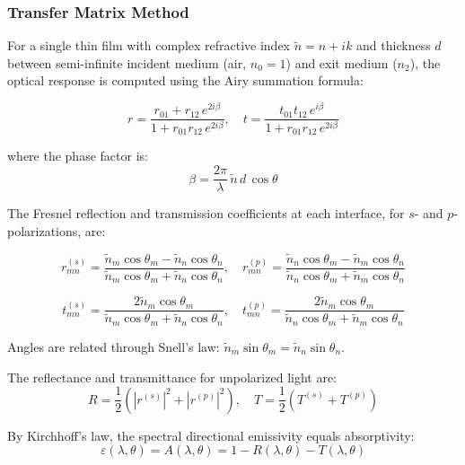 \subsubsection{Transfer Matrix Method}

For a single thin film with complex refractive index $\tilde{n} = n + ik$ and thickness $d$ between semi-infinite incident medium (air, $n_0 = 1$) and exit medium ($n_2$), the optical response is computed using the Airy summation formula:

\begin{equation}
  r = \frac{r_{01} + r_{12}\, e^{2i\beta}}{1 + r_{01} r_{12}\, e^{2i\beta}}, \quad
  t = \frac{t_{01} t_{12}\, e^{i\beta}}{1 + r_{01} r_{12}\, e^{2i\beta}}
  \label{eq:airy}
\end{equation}

where the phase factor is:
\begin{equation}
  \beta = \frac{2\pi}{\lambda}\,\tilde{n}\,d\,\cos\theta
  \label{eq:phase}
\end{equation}

The Fresnel reflection and transmission coefficients at each interface, for $s$- and $p$-polarizations, are:

\begin{equation}
  r_{mn}^{(s)} = \frac{\tilde{n}_m \cos\theta_m - \tilde{n}_n \cos\theta_n}{\tilde{n}_m \cos\theta_m + \tilde{n}_n \cos\theta_n}, \quad
  r_{mn}^{(p)} = \frac{\tilde{n}_n \cos\theta_m - \tilde{n}_m \cos\theta_n}{\tilde{n}_n \cos\theta_m + \tilde{n}_m \cos\theta_n}
  \label{eq:fresnel_r}
\end{equation}

\begin{equation}
  t_{mn}^{(s)} = \frac{2\tilde{n}_m \cos\theta_m}{\tilde{n}_m \cos\theta_m + \tilde{n}_n \cos\theta_n}, \quad
  t_{mn}^{(p)} = \frac{2\tilde{n}_m \cos\theta_m}{\tilde{n}_n \cos\theta_m + \tilde{n}_m \cos\theta_n}
  \label{eq:fresnel_t}
\end{equation}

Angles are related through Snell's law: $\tilde{n}_m \sin\theta_m = \tilde{n}_n \sin\theta_n$.

The reflectance and transmittance for unpolarized light are:
\begin{equation}
  R = \frac{1}{2}\left(|r^{(s)}|^2 + |r^{(p)}|^2\right), \quad
  T = \frac{1}{2}\left(T^{(s)} + T^{(p)}\right)
  \label{eq:RT}
\end{equation}

By Kirchhoff's law, the spectral directional emissivity equals absorptivity:
\begin{equation}
  \varepsilon(\lambda, \theta) = A(\lambda, \theta) = 1 - R(\lambda, \theta) - T(\lambda, \theta)
  \label{eq:kirchhoff}
\end{equation}

